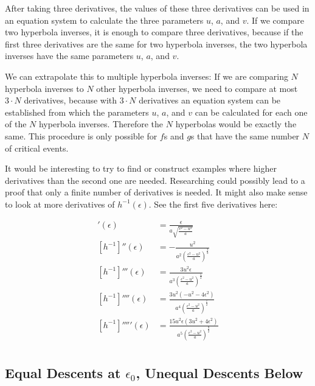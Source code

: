 After taking three derivatives, the values of these three derivatives can be used in an equation system to calculate the three parameters $u$, $a$, and $v$. If we compare two hyperbola inverses, it is enough to compare three derivatives, because if the first three derivatives are the same for two hyperbola inverses, the two hyperbola inverses have the same parameters $u$, $a$, and $v$.

We can extrapolate this to multiple hyperbola inverses: If we are comparing $N$ hyperbola inverses to $N$ other hyperbola inverses, we need to compare at most $3\cdot N$ derivatives, because with $3\cdot N$ derivatives an equation system can be established from which the parameters $u$, $a$, and $v$ can be calculated for each one of the $N$ hyperbola inverses. Therefore the $N$ hyperbolas would be exactly the same. This procedure is only possible for $f$s and $g$s that have the same number $N$ of critical events.

It would be interesting to try to find or construct examples where higher derivatives than the second one are needed. Researching could possibly lead to a proof that only a finite number of derivatives is needed. It might also make sense to look at more derivatives of $h^{-1}(\epsilon)$. See the first five derivatives here:

\begin{align*}
	[h^{-1}]'(\epsilon) &= \frac{ \epsilon }{ a\sqrt{\frac{\epsilon^2 - u^2}{a}} }\\
	[h^{-1}]''(\epsilon) &= -\frac{u^2}{a^2\left(\frac{\epsilon^2 - u^2}{a}\right)^{\frac{3}{2}}}\\
	[h^{-1}]'''(\epsilon) &= \frac{3u^2\epsilon}{a^3\left(\frac{\epsilon^2 - u^2}{a}\right)^{\frac{5}{2}}}\\
	[h^{-1}]''''(\epsilon) &= \frac{3u^2\left(-u^2-4\epsilon^2\right)}{a^4\left(\frac{\epsilon^2 - u^2}{a}\right)^{\frac{7}{2}}}\\
	[h^{-1}]'''''(\epsilon) &= \frac{15u^2\epsilon\left(3u^2+4\epsilon^2\right)}{a^5\left(\frac{\epsilon^2 - u^2}{a}\right)^{\frac{9}{2}}}\\
\end{align*}

	
\subsection{Equal Descents at $\epsilon_0$, Unequal Descents Below}

